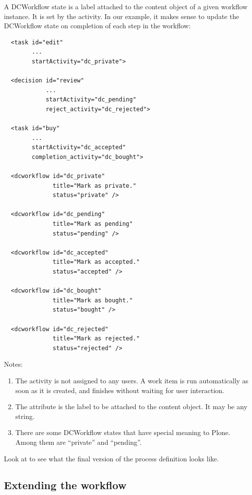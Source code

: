 A DCWorkflow state is a label attached to the content object of a given
workflow instance. It is set by the  activity. In our
example, it makes sense to update the DCWorkflow state on completion of each
step in the workflow:

\begin{verbatim}
  <task id="edit"
        ...
        startActivity="dc_private">

  <decision id="review"
            ...
            startActivity="dc_pending"
            reject_activity="dc_rejected">

  <task id="buy"
        ...
        startActivity="dc_accepted"
        completion_activity="dc_bought">

  <dcworkflow id="dc_private"
              title="Mark as private."
              status="private" />

  <dcworkflow id="dc_pending"
              title="Mark as pending"
              status="pending" />

  <dcworkflow id="dc_accepted"
              title="Mark as accepted."
              status="accepted" />

  <dcworkflow id="dc_bought"
              title="Mark as bought."
              status="bought" />

  <dcworkflow id="dc_rejected"
              title="Mark as rejected."
              status="rejected" />
\end{verbatim}

Notes:
\begin{enumerate}
\item The  activity is not assigned to any users. A
   work item is run automatically as soon as it is created,
  and finishes without waiting for user interaction.
\item The attribute  is the label to be attached to the content
  object. It may be any string.
\item There are some DCWorkflow states that have special meaning to Plone.
  Among them are ``private'' and ``pending''.
\end{enumerate}

Look at  to see
what the final version of the process definition looks like.

\subsection{Extending the workflow}

